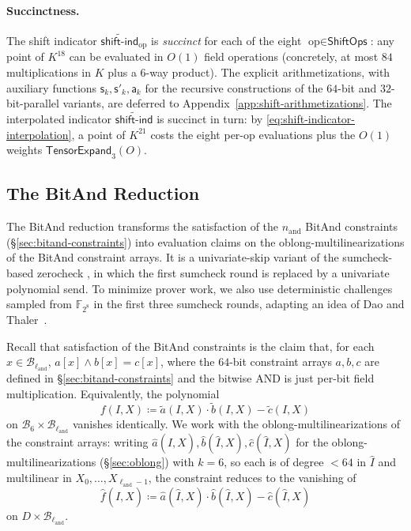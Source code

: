 \documentclass{article}
\theoremstyle{definition}
\newcommand*{\mle}{\widetilde}
\newcommand{\BB}{\mathcal{B}}
\newcommand{\FF}[1]{\mathbb{F}_{#1}}
\begin{document}
\paragraph{Succinctness.}
The shift indicator $\mle{\textsf{shift-ind}}_\text{op}$ is \emph{succinct} for each of the eight $\text{op} \in \textsf{ShiftOps}$: any point of $K^{18}$ can be evaluated in $O(1)$ field operations (concretely, at most $84$ multiplications in $K$ plus a $6$-way product). The explicit arithmetizations, with auxiliary functions $\mathsf{s}_k, \mathsf{s}'_k, \mathsf{a}_k$ for the recursive constructions of the $64$-bit and $32$-bit-parallel variants, are deferred to Appendix~\ref{app:shift-arithmetizations}. The interpolated indicator $\mle{\textsf{shift-ind}}$ is succinct in turn: by \eqref{eq:shift-indicator-interpolation}, a point of $K^{21}$ costs the eight per-op evaluations plus the $O(1)$ weights $\textsf{TensorExpand}_3(O)$.

\subsection{The BitAnd Reduction}
\label{sec:binand}

The BitAnd reduction transforms the satisfaction of the $n_\text{and}$ BitAnd constraints (\S\ref{sec:bitand-constraints}) into evaluation claims on the oblong-multilinearizations of the BitAnd constraint arrays. It is a univariate-skip variant of the sumcheck-based zerocheck \cite{Gruen:2024aa}, in which the first sumcheck round is replaced by a univariate polynomial send. To minimize prover work, we also use deterministic challenges sampled from $\FF{2^8}$ in the first three sumcheck rounds, adapting an idea of Dao and Thaler~\cite{eprint:2024/1038}.

Recall that satisfaction of the BitAnd constraints is the claim that, for each $x \in \BB_{\ell_\text{and}}$, $a[x] \land b[x] = c[x]$, where the $64$-bit constraint arrays $a, b, c$ are defined in \S\ref{sec:bitand-constraints} and the bitwise AND is just per-bit field multiplication. Equivalently, the polynomial
\[
  f(I, X) \coloneqq \mle{a}(I, X) \cdot \mle{b}(I, X) - \mle{c}(I, X)
\]
on $\BB_6 \times \BB_{\ell_\text{and}}$ vanishes identically. We work with the oblong-multilinearizations of the constraint arrays: writing $\widehat{a}(\widehat{I}, X), \widehat{b}(\widehat{I}, X), \widehat{c}(\widehat{I}, X)$ for the oblong-multilinearizations (\S\ref{sec:oblong}) with $k = 6$, so each is of degree $< 64$ in $\widehat{I}$ and multilinear in $X_0, \ldots, X_{\ell_\text{and} - 1}$, the constraint reduces to the vanishing of
\[
  \widehat{f}(\widehat{I}, X) \coloneqq \widehat{a}(\widehat{I}, X) \cdot \widehat{b}(\widehat{I}, X) - \widehat{c}(\widehat{I}, X)
\]
on $D \times \BB_{\ell_\text{and}}$.
\end{document}
